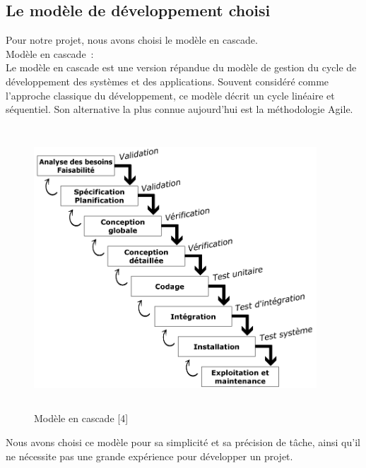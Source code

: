 \documentclass[11.5pt]{report}
\begin{document}
\subsection{Le modèle de développement choisi }
Pour notre projet, nous avons choisi le modèle en cascade.\\
Modèle en cascade :\\
Le modèle en cascade est une version répandue du modèle de gestion du cycle de développement des systèmes et des applications. Souvent considéré comme l'approche classique du développement, ce modèle décrit un cycle linéaire et séquentiel. Son alternative la plus connue aujourd’hui est la méthodologie Agile.
\begin{figure}[h]
	
	\begin{center}
		\includegraphics[width=300pt,height=300pt]{cascade.png} 
		\caption{Modèle en cascade [4]}
	\end{center}
	
\end{figure}
\clearpage
Nous avons choisi ce modèle pour sa simplicité et sa précision de tâche, ainsi qu’il ne nécessite pas une grande expérience pour développer un projet.
\end{document}
